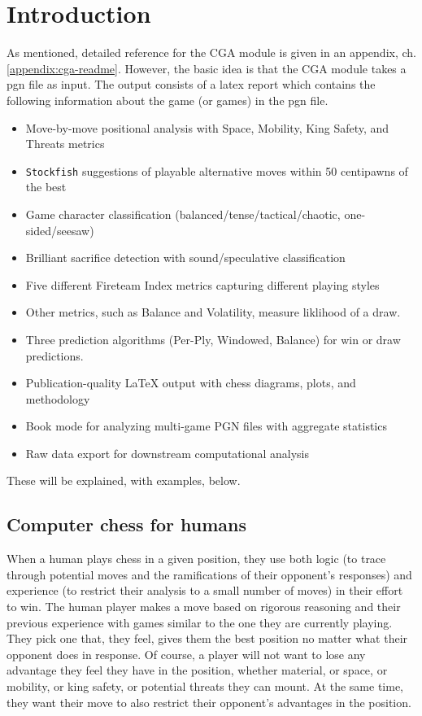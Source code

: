 \documentclass[12pt]{book}
\begin{document}
\chapter{Introduction}

As mentioned,
detailed reference for the CGA module is given in an appendix,
ch. \ref{appendix:cga-readme}.
However, the basic idea is that the CGA module takes a pgn file as input.
The output consists of a latex report which contains the following
information about the game (or games) in the pgn file.

\begin{itemize}
\item  
Move-by-move positional analysis with Space, Mobility, King Safety, and
Threats metrics
\item  
{\tt Stockfish} suggestions of playable alternative moves within 50 centipawns
of the best 
\item  
  Game character classification (balanced/tense/tactical/chaotic,
  one-sided/seesaw)
\item  
Brilliant sacrifice detection with sound/speculative classification
\item  
Five different Fireteam Index metrics capturing different playing styles
\item
Other metrics, such as Balance and Volatility, measure liklihood of a draw.
\item  
Three prediction algorithms (Per-Ply, Windowed, Balance) for win or draw predictions.
\item  
Publication-quality LaTeX output with chess diagrams, plots, and methodology
\item  
Book mode for analyzing multi-game PGN files with aggregate statistics
\item  
Raw data export for downstream computational analysis

\end{itemize}

These will be explained, with examples, below.

\section{Computer chess for humans}

When a human plays chess in a given position, they use
both logic (to trace through potential moves and the
ramifications of their opponent's responses) and
experience (to restrict their analysis
to a small number of moves) in their effort to win.
The human player makes a move based on rigorous reasoning and their
previous experience with games similar to the one they are
currently playing.
They pick one that, they feel, gives them the best position no
matter what their opponent does in response. Of course,
a player will not want to lose any advantage they feel they
have in the position, whether material, or space, or mobility, or king
safety, or potential threats they can mount.
At the same time, they want their move to also
restrict their opponent's advantages in the position.
\end{document}
